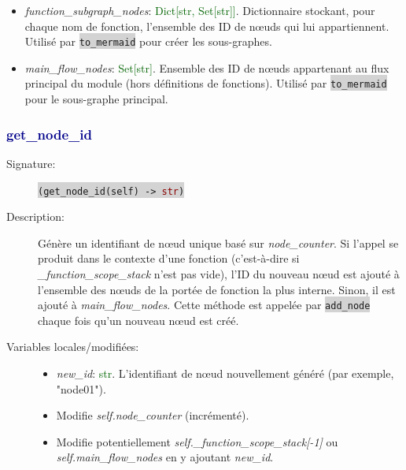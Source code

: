 \documentclass[11pt,a4paper]{article}
\newcommand{\code}[1]{\colorbox{lightgray}{\texttt{\small #1}}}
\newcommand{\var}[1]{\textit{#1}}
\newcommand{\vartype}[1]{\textcolor{darkgreen}{#1}}
\newcommand{\methodname}[1]{\textbf{\textcolor{darkblue}{#1}}}
\newcommand{\rettype}[1]{\textcolor{darkred}{#1}}
\begin{document}
\begin{description}
\begin{itemize}
        \item \var{function\_subgraph\_nodes}: \vartype{Dict[str, Set[str]]}. Dictionnaire stockant, pour chaque nom de fonction, l'ensemble des ID de nœuds qui lui appartiennent. Utilisé par \code{to\_mermaid} pour créer les sous-graphes.
        
        \item \var{main\_flow\_nodes}: \vartype{Set[str]}. Ensemble des ID de nœuds appartenant au flux principal du module (hors définitions de fonctions). Utilisé par \code{to\_mermaid} pour le sous-graphe principal.
    \end{itemize}
\end{description}

\subsubsection*{\methodname{get\_node\_id}}
\begin{description}
    \item[Signature:] \code{(get\_node\_id(self) -> \rettype{str})}
    \item[Description:] Génère un identifiant de nœud unique basé sur \var{node\_counter}. Si l'appel se produit dans le contexte d'une fonction (c'est-à-dire si \var{\_function\_scope\_stack} n'est pas vide), l'ID du nouveau nœud est ajouté à l'ensemble des nœuds de la portée de fonction la plus interne. Sinon, il est ajouté à \var{main\_flow\_nodes}. Cette méthode est appelée par \code{add\_node} chaque fois qu'un nouveau nœud est créé.
    \item[Variables locales/modifiées:]
    \begin{itemize}
        \item \var{new\_id}: \vartype{str}. L'identifiant de nœud nouvellement généré (par exemple, "node01").
        \item Modifie \var{self.node\_counter} (incrémenté).
        \item Modifie potentiellement \var{self.\_function\_scope\_stack[-1]} ou \var{self.main\_flow\_nodes} en y ajoutant \var{new\_id}.
    \end{itemize}
\end{description}
\end{document}
